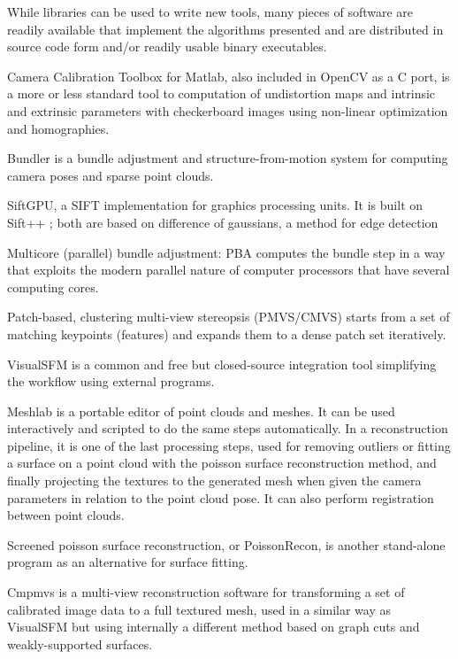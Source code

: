 While libraries can be used to write new tools, many pieces of software are readily available that implement the algorithms presented and are distributed in source code form and/or readily usable binary executables.

Camera Calibration Toolbox for Matlab, also included in OpenCV as a C port, is a more or less standard tool to computation of undistortion maps and intrinsic and extrinsic parameters with checkerboard images using non-linear optimization and homographies. \cite{camcalmatlab}

Bundler is a bundle adjustment and structure-from-motion system for computing camera poses and sparse point clouds. \cite{snavely2006photo}

SiftGPU, a SIFT implementation for graphics processing units. \cite{changchang2007siftgpu} It is built on Sift++ \cite{vedaldi2011sift++}; both are based on difference of gaussians, a method for edge detection \cite{marr1980theory}

Multicore (parallel) bundle adjustment: PBA computes the bundle step in a way that exploits the modern parallel nature of computer processors that have several computing cores. \cite{wu2011multicore}

Patch-based, clustering multi-view stereopsis (PMVS/CMVS) starts from a set of matching keypoints (features) and expands them to a dense patch set iteratively. \cite{furukawa2010accurate,furukawa2012patch}

VisualSFM \cite{wu2013towards} is a common and free but closed-source integration tool simplifying the workflow using external programs.

Meshlab \cite{meshlab} is a portable editor of point clouds and meshes.
It can be used interactively and scripted to do the same steps automatically.
In a reconstruction pipeline, it is one of the last processing steps, used for removing outliers or fitting a surface on a point cloud with the poisson surface reconstruction method, and finally projecting the textures to the generated mesh when given the camera parameters in relation to the point cloud pose.
It can also perform registration between point clouds.

Screened poisson surface reconstruction, or PoissonRecon, is another stand-alone program as an alternative for surface fitting. \cite{kazhdan2013screened}

Cmpmvs is a multi-view reconstruction software for transforming a set of calibrated image data to a full textured mesh, used in a similar way as VisualSFM but using internally a different method based on graph cuts and weakly-supported surfaces.
\cite{jancosek2011multi}

